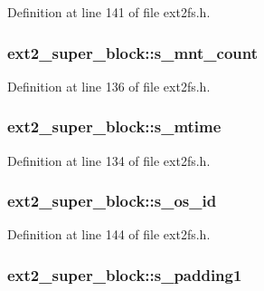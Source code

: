 \-Definition at line 141 of file ext2fs.\-h.

\hypertarget{structext2__super__block_a0a2557d9e186c2774e4eac28ef07a942}{
\subsubsection[{s\-\_\-mnt\-\_\-count}]{ {\bf ext2\-\_\-super\-\_\-block\-::s\-\_\-mnt\-\_\-count}}}\label{structext2__super__block_a0a2557d9e186c2774e4eac28ef07a942}


\-Definition at line 136 of file ext2fs.\-h.

\hypertarget{structext2__super__block_a3966a51d4e26f1b0280798db227b9720}{
\subsubsection[{s\-\_\-mtime}]{ {\bf ext2\-\_\-super\-\_\-block\-::s\-\_\-mtime}}}\label{structext2__super__block_a3966a51d4e26f1b0280798db227b9720}


\-Definition at line 134 of file ext2fs.\-h.

\hypertarget{structext2__super__block_a990be5055254a2aeed3a6366cd535818}{
\subsubsection[{s\-\_\-os\-\_\-id}]{ {\bf ext2\-\_\-super\-\_\-block\-::s\-\_\-os\-\_\-id}}}\label{structext2__super__block_a990be5055254a2aeed3a6366cd535818}


\-Definition at line 144 of file ext2fs.\-h.

\hypertarget{structext2__super__block_a1b0760049d39f6cfb1b26af0a01f64d2}{
\subsubsection[{s\-\_\-padding1}]{ {\bf ext2\-\_\-super\-\_\-block\-::s\-\_\-padding1}}}\label{structext2__super__block_a1b0760049d39f6cfb1b26af0a01f64d2}



